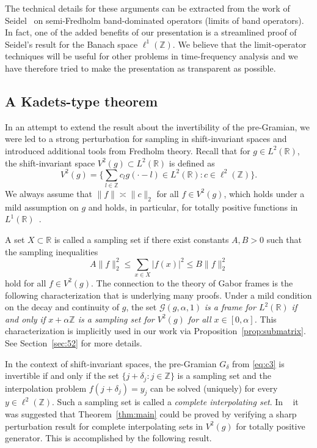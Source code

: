 \documentclass[reqno,a4paper,12pt]{amsart}
\numberwithin{equation}{section}
\def\Z{{\mathbb Z}}
\def\R{{\mathbb R}}
\newcommand{\lt}{{L^2(\R)}}
\newcommand\1{\mathds{1}}
\begin{document}
The technical details for these arguments can be extracted from the
work of  Seidel~\cite{seidel2015semi}
on semi-Fredholm band-dominated operators (limits of band
operators). In fact, one of the added benefits of our presentation is
a streamlined proof of Seidel's result for the Banach space $\ell
^1(\Z )$. We believe that the limit-operator techniques will be useful
for other problems in time-frequency analysis and we have therefore tried
to make the presentation as transparent as possible. 

\subsection{A Kadets-type theorem}
In an attempt  to extend the result about the invertibility of
the pre-Gramian, we were  led to a strong
perturbation for sampling in shift-invariant spaces and introduced
additional tools from Fredholm theory. Recall that 
for $g\in L^2(\mathbb R)$, the shift-invariant space $V^2(g) \subset
\lt$ is defined as 
$$
    V^2(g)
    =
    \Big\{ \sum_{l\in\Z} c_l g(\cdot-l) \in L^2(\R): c\in \ell^2(\Z)\Big\} .
$$
We always assume that $\|f\| \asymp \|c\|_2$ for all $f\in V^2(g)$,
which holds under a mild assumption on $g$ and holds, in particular,  for
totally positive functions in $L^1(\R )$~\cite{GroechenigStoeckler2013}.

A set $X \subset \R$ is called a sampling set if there exist
constants $A,B>0$ such that the sampling inequalities
$$
A\|f\|_2^2 \leq \sum _{x\in X} |f(x)|^2 \leq B\|f\|_2^2
$$
hold for all $ f\in V^2(g) $.  
The connection to the theory of Gabor frames is the following
characterization that is underlying many proofs.  Under a mild
condition on the decay and continuity of $g$, the set  $\mathcal{G}(g,\alpha,
1)$ \emph{is a frame for $L^2(\R )$ if and only if $x+\alpha\Z $ is a
  sampling set for $V^2(g)$ for all $x\in [0,\alpha ]$.} This
characterization is implicitly used in our work via
Proposition~\ref{prop:submatrix}. See Section~\ref{sec:52} for more details. 

In the context of shift-invariant spaces,  the pre-Gramian $G_\delta $ from \eqref{eq:c3} is
invertible if and only if the set $\{ j+\delta _j: j\in \Z \}$ is a
sampling set and the interpolation problem $f(j+\delta _j) = y_j$ can
be solved (uniquely)  for every $y\in \ell ^2(\Z )$. Such a sampling
set is called a \emph{complete interpolating set}. In ~\cite{Gro26} it was
suggested that Theorem~\ref{thm:main} could be proved by verifying a
sharp perturbation result for complete interpolating sets in $V^2(g)$
for totally positive generator. This is accomplished by the following
result. 
\end{document}
